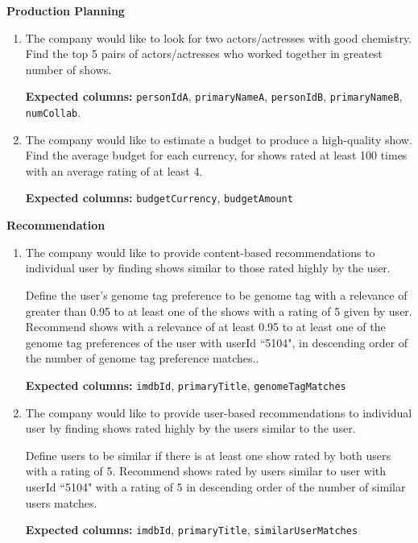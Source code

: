 \documentclass[10pt,titlepage]{article}
\begin{document}
\textbf{Production Planning}
\begin{enumerate}[resume]
    \item The company would like to look for two actors/actresses with good chemistry. Find the top 5 pairs of
        actors/actresses who worked together in greatest number of shows.

        \textbf{Expected columns:} \texttt{personIdA}, \texttt{primaryNameA}, \texttt{personIdB}, \texttt{primaryNameB},
        \texttt{numCollab}.

    \item The company would like to estimate a budget to produce a high-quality show. Find the average budget for each
        currency, for shows rated at least 100 times with an average rating of at least 4.

        \textbf{Expected columns:} \texttt{budgetCurrency}, \texttt{budgetAmount}
\end{enumerate}

\textbf{Recommendation}
\begin{enumerate}[resume]
    \item The company would like to provide content-based recommendations to individual user by finding shows similar to
        those rated highly by the user.

        Define the user’s genome tag preference to be genome tag with a relevance of greater than 0.95 to at least one
        of the shows with a rating of 5 given by user. Recommend shows with a relevance of at least 0.95 to at least one
        of the genome tag preferences of the user with userId ``5104", in descending order of the number of genome tag
        preference matches..

        \textbf{Expected columns:} \texttt{imdbId}, \texttt{primaryTitle}, \texttt{genomeTagMatches}

    \item The company would like to provide user-based recommendations to individual user by finding shows rated highly
        by the users similar to the user.

        Define users to be similar if there is at least one show rated by both users with a rating of 5. Recommend shows
        rated by users similar to user with userId ``5104" with a rating of 5 in descending order of the number of
        similar users matches.

        \textbf{Expected columns:} \texttt{imdbId}, \texttt{primaryTitle}, \texttt{similarUserMatches}
\end{enumerate}
\end{document}
